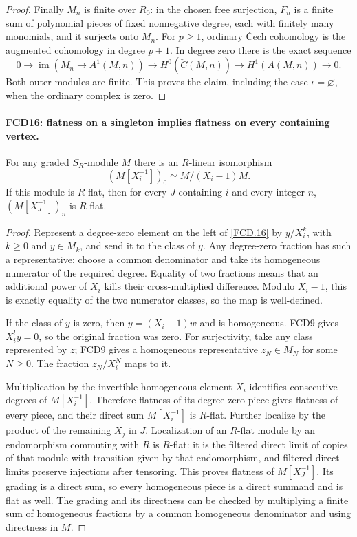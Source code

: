 \documentclass[11pt,a4paper]{article}
\numberwithin{equation}{section}
\theoremstyle{remark}\newtheorem{remark}[theorem]{Remark}
\begin{document}
\begin{proof}
Finally $M_n$ is finite over $R_0$: in the chosen free surjection,
$F_n$ is a finite sum of polynomial pieces of fixed nonnegative
degree, each with finitely many monomials, and it surjects onto
$M_n$.  For $p\ge1$, ordinary \v Cech cohomology is the
augmented cohomology in degree $p+1$.  In degree zero there is
the exact sequence
\[
 0\longrightarrow\operatorname{im}(M_n\to A^1(M,n))
 \longrightarrow H^0(\check C(M,n))
 \longrightarrow H^1(A(M,n))\longrightarrow0.
\]
Both outer modules are finite.  This proves the claim, including
the case $\iota=\varnothing$, when the ordinary complex is zero.
\end{proof}

\paragraph{FCD16: flatness on a singleton implies flatness on every containing vertex.}
\label{claim:FCD16}
For any graded $S_R$-module $M$ there is an $R$-linear
isomorphism
\[
 (M[X_i^{-1}])_0\simeq M/(X_i-1)M.                  \tag{FCD.16}\label{FCD.16}
\]
If this module is $R$-flat, then for every $J$ containing $i$
and every integer $n$, $(M[X_J^{-1}])_n$ is $R$-flat.

\begin{proof}
Represent a degree-zero element on the left of \eqref{FCD.16}
by $y/X_i^k$, with $k\ge0$ and $y\in M_k$, and send it to
the class of $y$.  Any degree-zero fraction has such a
representative: choose a common denominator and take its
homogeneous numerator of the required degree.  Equality of two
fractions means that an additional power of $X_i$ kills their
cross-multiplied difference.  Modulo $X_i-1$, this is exactly
equality of the two numerator classes, so the map is well-defined.

If the class of $y$ is zero, then $y=(X_i-1)w$ and is
homogeneous.  FCD9 gives $X_i^ly=0$, so the original fraction
was zero.  For surjectivity, take any class represented by $z$;
FCD9 gives a homogeneous representative $z_N\in M_N$ for
some $N\ge0$.  The fraction $z_N/X_i^N$ maps to it.

Multiplication by the invertible homogeneous element $X_i$
identifies consecutive degrees of $M[X_i^{-1}]$.
Therefore flatness of its degree-zero piece gives flatness of
every piece, and their direct sum $M[X_i^{-1}]$ is $R$-flat.
Further localize by the product of the remaining $X_j$ in $J$.
Localization of an $R$-flat module by an endomorphism commuting
with $R$ is $R$-flat: it is the filtered direct limit of copies
of that module with transition given by that endomorphism, and
filtered direct limits preserve injections after tensoring.
This proves flatness of $M[X_J^{-1}]$.
Its grading is a direct sum, so every homogeneous piece is a
direct summand and is flat as well.  The grading and its directness
can be checked by multiplying a finite sum of homogeneous fractions
by a common homogeneous denominator and using directness in $M$.
\end{proof}
\end{document}
